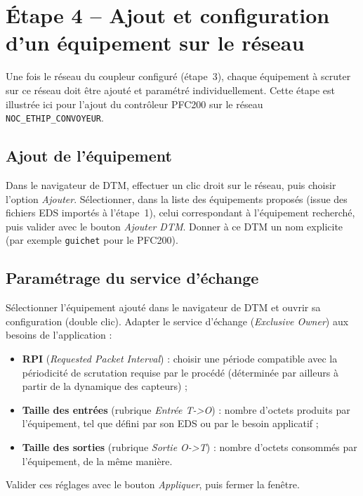 \section{Étape 4 -- Ajout et configuration d'un équipement sur le réseau}
\label{secEtapeAjoutEquipement}

Une fois le réseau du coupleur configuré (étape~3), chaque équipement à
scruter sur ce réseau doit être ajouté et paramétré individuellement. Cette
étape est illustrée ici pour l'ajout du contrôleur PFC200 sur le réseau
\texttt{NOC\_ETHIP\_CONVOYEUR}.

\subsection{Ajout de l'équipement}

Dans le navigateur de DTM, effectuer un clic droit sur le réseau, puis choisir l'option
\emph{Ajouter}. Sélectionner, dans la liste des équipements proposés (issue
des fichiers EDS importés à l'étape~1), celui correspondant à l'équipement
recherché, puis valider avec le bouton \emph{Ajouter DTM}. Donner à ce DTM
un nom explicite (par exemple \texttt{guichet} pour le PFC200).

\subsection{Paramétrage du service d'échange}

Sélectionner l'équipement ajouté dans le navigateur de DTM et ouvrir sa
configuration (double clic). Adapter le service d'échange (\emph{Exclusive
Owner}) aux besoins de l'application :

\begin{itemize}
    \item \textbf{RPI} (\emph{Requested Packet Interval}) : choisir une
    période compatible avec la périodicité de scrutation requise par le
    procédé (déterminée par ailleurs à partir de la dynamique des
    capteurs) ;
    \item \textbf{Taille des entrées} (rubrique \emph{Entrée T->O}) :
    nombre d'octets produits par l'équipement, tel que défini par son EDS
    ou par le besoin applicatif ;
    \item \textbf{Taille des sorties} (rubrique \emph{Sortie O->T}) :
    nombre d'octets consommés par l'équipement, de la même manière.
\end{itemize}

Valider ces réglages avec le bouton \emph{Appliquer}, puis fermer la
fenêtre.

